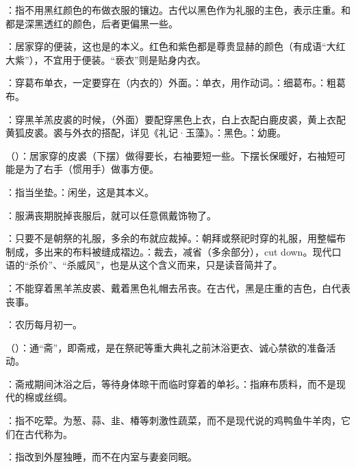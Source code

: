 {
\item {}：指不用黑红颜色的布做衣服的镶边。古代以黑色作为礼服的主色，表示庄重。和都是深黑透红的颜色，后者更偏黑一些。
\item {}：居家穿的便装，这也是的本义。红色和紫色都是尊贵显赫的颜色（有成语“大红大紫”），不宜用于便装。“亵衣”则是贴身内衣。
\item {}：穿葛布单衣，一定要穿在（内衣的）外面。：单衣，用作动词。：细葛布。：粗葛布。
\item {}：穿黑羊羔皮裘的时候，（外面）要配穿黑色上衣，白上衣配白鹿皮裘，黄上衣配黄狐皮裘。裘与外衣的搭配，详见《礼记·玉藻》。：黑色。：幼鹿。
\item {}（）：居家穿的皮裘（下摆）做得要长，右袖要短一些。下摆长保暖好，右袖短可能是为了右手（惯用手）做事方便。
\item {}：指当坐垫。：闲坐，这是其本义。
\item {}：服满丧期脱掉丧服后，就可以任意佩戴饰物了。
\item {}：只要不是朝祭的礼服，多余的布就应裁掉。：朝拜或祭祀时穿的礼服，用整幅布制成，多出来的布料被缝成褶边。：裁去，减省（多余部分），cut down。现代口语的“杀价”、“杀威风”，也是从这个含义而来，只是读音简并了。
\item {}：不能穿着黑羊羔皮裘、戴着黑色礼帽去吊丧。在古代，黑是庄重的吉色，白代表丧事。
\item {}：农历每月初一。
}
{}


{
\item {}（）：通“斋”，即斋戒，是在祭祀等重大典礼之前沐浴更衣、诚心禁欲的准备活动。
\item {}：斋戒期间沐浴之后，等待身体晾干而临时穿着的单衫。：指麻布质料，而不是现代的棉或丝绸。
\item {}：指不吃荤。为葱、蒜、韭、椿等刺激性蔬菜，而不是现代说的鸡鸭鱼牛羊肉，它们在古代称为。%
\item {}：指改到外屋独睡，而不在内室与妻妾同眠。
}
{}


